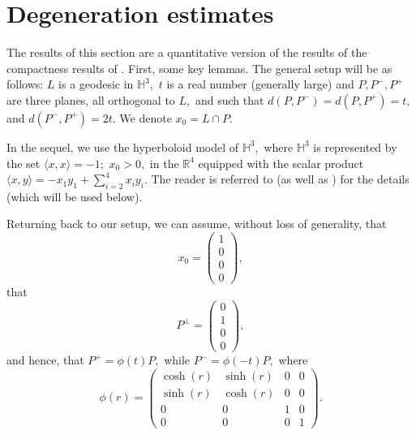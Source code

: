 \documentclass[12pt]{amsart}
\theoremstyle{remark}
\begin{document}
\section{Degeneration estimates}
\label{degennes}
The results of this section are a quantitative version of the results of the compactness results of \cite{thes,thes0}. 
First, some key lemmas. The general setup will be as follows: $L$ is a geodesic in $\mathbb{H}^3,$  $t$ is a real number (generally large) and $P, P^-, P^+$ are three planes, all orthogonal to $L,$ and such that $d(P, P^-) = d(P, P^+) = t,$ and $d(P^-, P^+) = 2 t.$ We denote $x_0 = L \cap P.$

In the sequel, we use the hyperboloid model of $\mathbb{H}^3,$ where $\mathbb{H}^3$ is represented by the set $\langle x, x \rangle = -1;$ $x_0 > 0,$ in the $\mathbb{R}^4$ equipped with the scalar product $\langle x, y \rangle = - x_1 y_1 + \sum_{i=2}^4 x_i y_i.$ The reader is referred to \cite{wptbook} (as well as \cite{thes}) for the details (which will be used below).

Returning back to our setup, we can assume, without loss of generality, that
\[
x_0=\begin{pmatrix}1\\0\\0\\0\end{pmatrix},
\]
that 
\[
P^\perp = \begin{pmatrix}0\\1\\0\\0\end{pmatrix},
\]
and hence, that $P^+ = \phi(t) P,$ while $P^- = \phi(-t) P,$ where
\[
\phi(r) = \begin{pmatrix} \cosh(r) & \sinh(r) & 0 & 0\\
                                           \sinh(r) & \cosh(r) & 0 & 0\\
                                           0 & 0 &1 &0\\
                                           0 & 0 & 0 &1
                                           \end{pmatrix}.
                                           \]
                                           
\end{document}
